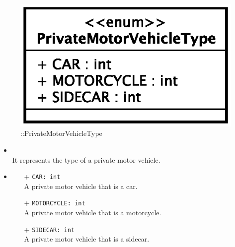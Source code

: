\begin{figure}[h]
\centering
\includegraphics[scale=0.6,keepaspectratio]{images/solution/app/backend/private_motor_vehicle_type.eps}
\caption{\pReactiveComponentStretchDecoration::PrivateMotorVehicleType}
\label{fig:sd-app-private-motor-vehicle-type}
\end{figure}
\FloatBarrier
\begin{itemize}
  \item \textbf{\descr} \\
    It represents the type of a private motor vehicle.
  \item \textbf{}
  \begin{itemize}
    \item[+] \texttt{CAR: int} \\
    A private motor vehicle that is a car.
    \item[+] \texttt{MOTORCYCLE: int} \\
    A private motor vehicle that is a motorcycle.
    \item[+] \texttt{SIDECAR: int} \\
    A private motor vehicle that is a sidecar.
  \end{itemize}
\end{itemize}